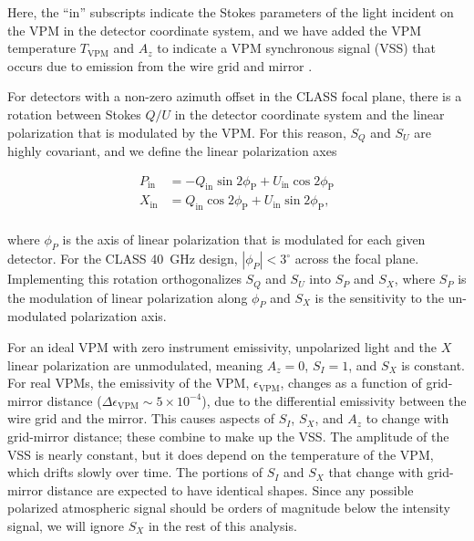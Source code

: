 \documentclass[twocolumn, tighten, numberedappendix, twocolappendix]{aastex63}
\begin{document}
\noindent Here, the ``$\mathrm{in}$'' subscripts indicate the Stokes parameters of the light incident on the VPM in the detector coordinate system, and we have added the VPM temperature $T_\mathrm{VPM}$ and $A_z$ to indicate a VPM synchronous signal (VSS) that occurs due to emission from the wire grid and mirror \citep{mill15}.

For detectors with a non-zero azimuth offset in the CLASS focal plane, there is a rotation between Stokes ${Q}/{U}$ in the detector coordinate system and the linear polarization that is modulated by the VPM. For this reason, $S_{Q}$ and $S_{U}$ are highly covariant, and we define the linear polarization axes

\begin{equation}
\begin{aligned}
P_\mathrm{in}  &= -Q_\mathrm{in}\sin{2\phi_\mathrm{P}} + U_\mathrm{in}\cos{2\phi_\mathrm{P}} \\
X_\mathrm{in}  &= Q_\mathrm{in}\cos{2\phi_\mathrm{P}} + U_\mathrm{in}\sin{2\phi_\mathrm{P}}, \\
\end{aligned}
\label{eg:lin_axes}
\end{equation}

\noindent where $\phi_{P}$ is the axis of linear polarization that is modulated for each given detector. For the CLASS 40~GHz design, $|\phi_{P}| < 3^\circ$ across the focal plane. Implementing this rotation orthogonalizes $S_{Q}$ and $S_{U}$ into $S_{P}$ and $S_{X}$, where $S_{P}$ is the modulation of linear polarization along $\phi_{P}$ and $S_{X}$ is the sensitivity to the un-modulated polarization axis.

For an ideal VPM with zero instrument emissivity, unpolarized light and the $X$ linear polarization are unmodulated, meaning $A_z=0$, $S_{I}=1$, and $S_{X}$ is constant. For real VPMs, the emissivity of the VPM, $\epsilon_\mathrm{VPM}$, changes as a function of grid-mirror distance ($\Delta\epsilon_\mathrm{VPM} \sim 5\times10^{-4}$), due to the differential emissivity between the wire grid and the mirror. This causes aspects of $S_I$, $S_X$, and $A_z$ to change with grid-mirror distance; these combine to make up the VSS. The amplitude of the VSS is nearly constant, but it does depend on the temperature of the VPM, which drifts slowly over time. The portions of $S_{I}$ and $S_{X}$ that change with grid-mirror distance are expected to have identical shapes. Since any possible polarized atmospheric signal should be orders of magnitude below the intensity signal, we will ignore $S_{X}$ in the rest of this analysis.
\end{document}
